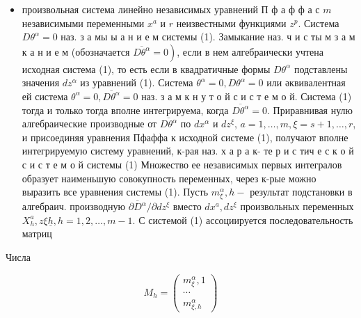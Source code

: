 \documentclass[10pt]{article}
\begin{document}
\begin{itemize}

  \item произвольная система линейно независимых уравнений $П$ ф а ф ф а с $m$ независимыми переменными $x^{a}$ и $r$ неизвестными функциями $z^{p}$. Система $D \theta^{\alpha}=0$ наз. з а мы ы а н и е м системы (1). Замыкание наз. ч и с ты м з а м к а н и е м (обозначается $\left.\overline{D \theta^{\alpha}}=0\right)$, если в нем алгебраически учтена исходная система (1), то есть если в квадратичные формы $D \theta^{\alpha}$ подставлены значения $d z^{\alpha}$ из уравнений (1). Система $\theta^{\alpha}=0, D \theta^{\alpha}=0$ или әквивалентная ей система $\theta^{\alpha}=0, \overline{D \theta^{\alpha}}=0$ наз. з а м к н у т о й с и с т е м о й. Система (1) тогда и только тогда вполне интегрируема, когда $\overline{D \theta^{\alpha}}=0$. Приравнивая нулю алгебраические производные от $\overline{D \theta^{\alpha}}$ по $d x^{\alpha}$ и $d z^{\xi}$, $a=1, \ldots, m, \xi=s+1, \ldots, r$, и присоединяя уравнения Пфаффа к исходной системе (1), получают вполне интегрируемую систему уравнений, к-рая наз. х а р а к- те р и с тич е с к о й с и с т е м о й системы (1) Множество ее независимых первых интегралов образует наименьшую совокупность переменных, через к-рые можно выразить все уравнения системы (1). Пусть $m_{\xi}^{\alpha}, h-$ результат подстановки в алгебраич. производную $\overline{\partial D^{\alpha}} / \partial d z^{\xi}$ вместо $d x^{a}, d z^{\xi}$ произвольных переменных $X_{h}^{a}, z \xi \underline{h}, h=1,2, \ldots, m-1$. С системой (1) ассоциируется последовательность матриц

\end{itemize}



Числа



\[

M_{h}=\left(\begin{array}{c}

m_{\xi}^{\alpha}, 1 \\

\cdots \\

m_{\xi, h}^{\alpha}

\end{array}\right)

\]
\end{document}

